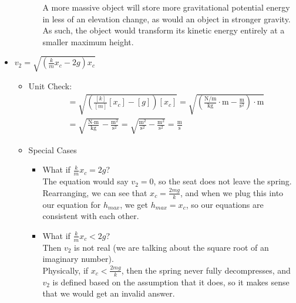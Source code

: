 \documentclass[]{article}
\begin{document}
\begin{TeacherMargin}
\begin{itemize}
\begin{itemize}
\begin{itemize}
			A more massive object will store more gravitational potential energy in less of an elevation change, as would an object in stronger gravity. As such, the object would transform its kinetic energy entirely at a smaller maximum height.
		\end{itemize}
	\end{itemize}
	\item $v_{2}=\sqrt{\left(\frac{k}{m}x_{c}-2g\right)x_{c}}$
	\begin{itemize}
		\item Unit Check:
		\begin{align*}
		[v_{2}] & = \sqrt{\left(\frac{[k]}{[m]}[x_{c}]-[g]\right)[x_{c}]} = \sqrt{\left(\frac{\text{N}/\text{m}}{\text{kg}}\cdot\text{m}-\frac{\text{m}}{\text{s}^{2}}\right)\cdot\text{m}} \\
		& = \sqrt{\frac{\text{N}\cdot\text{m}}{\text{kg}}-\frac{\text{m}^{2}}{\text{s}^{2}}} = \sqrt{\frac{\text{m}^{2}}{\text{s}^{2}}-\frac{\text{m}^{2}}{\text{s}^{2}}} = \frac{\text{m}}{\text{s}}
		\end{align*}
		\item Special Cases
		\begin{itemize}
			\item What if $\frac{k}{m}x_{c} = 2g$? \\
			The equation would say $v_{2}=0$, so the seat does not leave the spring. Rearranging, we can see that $x_{c} = \frac{2mg}{k}$, and when we plug this into our equation for $h_{max}$, we get $h_{max}=x_{c}$, so our equations are consistent with each other.
			\item What if $\frac{k}{m}x_{c} < 2g$? \\
			Then $v_{2}$ is not real (we are talking about the square root of an imaginary number). \\
			Physically, if $x_{c} < \frac{2mg}{k}$, then the spring never fully decompresses, and $v_{2}$ is defined based on the assumption that it does, so it makes sense that we would get an invalid answer.
		\end{itemize}
	\end{itemize}
\end{itemize}
\end{TeacherMargin}
\end{document}
